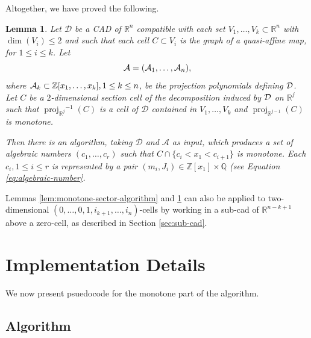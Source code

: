 \documentclass[
]{book}
\newtheorem{lemma}{Lemma}[chapter]
\theoremstyle{definition}
\theoremstyle{definition}
\theoremstyle{definition}
\theoremstyle{definition}
\theoremstyle{remark}
\begin{document}
Altogether, we have proved the following.

\begin{lemma}
\protect\hypertarget{lem:monotone-section-algorithm}{}\label{lem:monotone-section-algorithm}Let \(\mathcal{D}\) be a CAD of \(\mathbb{R}^n\) compatible with each set \(V_1,\ldots,V_k \subset \mathbb{R}^n\) with \(\dim(V_i) \le 2\) and such that each cell \(C \subset V_i\) is the graph of a quasi-affine map, for \(1\le i \le k\). Let
\[
{\cal A} = ({\cal A}_1,\ldots,{\cal A}_n),
\]
where \({\cal A}_k \subset \mathbb{Z}[x_1,\ldots,x_k], 1 \le k \le n\), be the projection polynomials defining \(\cal D\).
Let \(C\) be a \(2\)-dimensional section cell of the decomposition induced by \(\cal D\) on \(\mathbb{R}^{j}\) such that \({\operatorname{proj}_{\mathbb{R}^{j}}}^{-1}(C)\) is a cell of \(\mathcal{D}\) contained in \(V_1,\ldots,V_k\) and \({\operatorname{proj}_{\mathbb{R}^{j-1}}}(C)\) is monotone.

Then there is an algorithm, taking \(\mathcal{D}\) and \(\mathcal{A}\) as input, which produces a set of algebraic numbers \((c_1,\ldots,c_r)\) such that \(C \cap \{ c_i < x_1 < c_{i+1} \}\) is monotone. Each \(c_i, 1 \le i \le r\) is represented by a pair \((m_i, J_i) \in \mathbb{Z}[x_1] \times \mathbb{Q}\) (see Equation \eqref{eq:algebraic-number}.
\end{lemma}

\leavevmode\hypertarget{monotone-sub-cad}{}%
Lemmas \ref{lem:monotone-sector-algorithm} and \ref{lem:monotone-section-algorithm} can also be applied to two-dimensional \((0,\ldots,0,1,i_{k+1},\ldots,i_n)\)-cells by working in a sub-cad of \(\mathbb{R}^{n-k+1}\) above a zero-cell, as described in Section \ref{sec:sub-cad}.

\hypertarget{implementation-details}{%
\section{Implementation Details}\label{implementation-details}}

We now present psuedocode for the monotone part of the algorithm.

\hypertarget{sec:monotone-algorithm}{%
\subsection{Algorithm}\label{sec:monotone-algorithm}}
\end{document}
